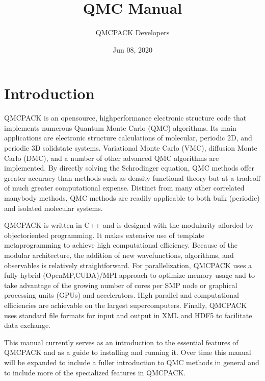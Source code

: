 \documentclass[letterpaper,10pt,english]{sphinxmanual}
\title{QMC Manual}
\date{Jun 08, 2020}
\author{QMCPACK Developers}
\begin{document}
\pagestyle{empty}
\sphinxmaketitle
\pagestyle{plain}
\sphinxtableofcontents
\pagestyle{normal}
\label{\detokenize{index::doc}}




\chapter{Introduction}
\label{\detokenize{introduction:introduction}}\label{\detokenize{introduction:id1}}\label{\detokenize{introduction::doc}}
QMCPACK is an open\sphinxhyphen{}source, high\sphinxhyphen{}performance electronic structure code
that implements numerous Quantum Monte Carlo (QMC) algorithms. Its main
applications are electronic structure calculations of molecular,
periodic 2D, and periodic 3D solid\sphinxhyphen{}state systems. Variational Monte
Carlo (VMC), diffusion Monte Carlo (DMC), and a number of other advanced
QMC algorithms are implemented. By directly solving the Schrodinger
equation, QMC methods offer greater accuracy than methods such as
density functional theory but at a trade\sphinxhyphen{}off of much greater
computational expense. Distinct from many other correlated many\sphinxhyphen{}body
methods, QMC methods are readily applicable to both bulk (periodic) and
isolated molecular systems.

QMCPACK is written in C++ and is designed with the modularity afforded
by object\sphinxhyphen{}oriented programming. It makes extensive use of template
metaprogramming to achieve high computational efficiency. Because of the
modular architecture, the addition of new wavefunctions, algorithms, and
observables is relatively straightforward. For parallelization, QMCPACK
uses a fully hybrid (OpenMP,CUDA)/MPI approach to optimize memory usage
and to take advantage of the growing number of cores per SMP node or
graphical processing units (GPUs) and accelerators. High parallel and
computational efficiencies are achievable on the largest supercomputers.
Finally, QMCPACK uses standard file formats for input and output in XML
and HDF5 to facilitate data exchange.

This manual currently serves as an introduction to the essential
features of QMCPACK and as a guide to installing and running it. Over
time this manual will be expanded to include a fuller introduction to
QMC methods in general and to include more of the specialized features
in QMCPACK.
\end{document}
